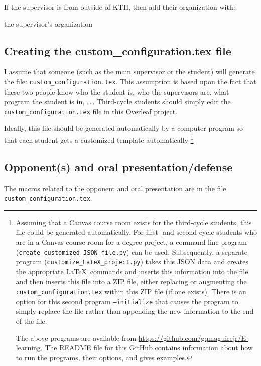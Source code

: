 \documentclass[12pt, twoside]{article}
\newcommand{\fname}[1]{\texttt{#1}}
\begin{document}
If the supervisor is from outside of \gls{KTH}, then add their organization with:
\begin{description}[leftmargin=!, labelwidth =\widthof{\texttt{\textbackslash secondAuthorsFirstname\{\}}}]
\item [\texttt{\textbackslash supervisorXsOrganization\{\}}] the supervisor's organization
\end{description}

\subsection{Creating the custom\_configuration.tex file}
\label{sec:customisedConfigFile}
I assume that someone (such as the main supervisor or the student) will generate the file: \fname{custom\_configuration.tex}. This assumption is based upon the fact that these two people know who the student is, who the supervisors are, what program the student is in, \ldots\,. Third-cycle students should simply edit the \fname{custom\_configuration.tex} file in this Overleaf project.

Ideally, this file should be generated automatically by a computer program so that each student gets a customized template automatically \footnote{Assuming that a Canvas course room exists for the third-cycle students, this file could be generated automatically. For first- and second-cycle students who are in a Canvas course room for a degree project, a command line program (\texttt{create\_customized\_JSON\_file.py}) can be used. 
Subsequently, a separate program (\texttt{customize\_LaTeX\_project.py}) takes this \gls{JSON} data and creates the appropriate \LaTeX\  commands and inserts this information into the file and then inserts this file into a ZIP file, either replacing or augmenting the \fname{custom\_configuration.tex} within this ZIP file (if one exists). There is an option for this second program \texttt{--initialize} that causes the program to simply replace the file rather than appending the new information to the end of the file.

The above programs are available from \url{https://github.com/gqmaguirejr/E-learning}. The README file for this GitHub contains information about how to run the programs, their options, and gives examples.}

\subsection{Opponent(s) and oral presentation/defense}
\label{sec:opponentMacros}
The macros related to the opponent and oral presentation are in the file \linebreak[4] \fname{custom\_configuration.tex}.
\end{document}
